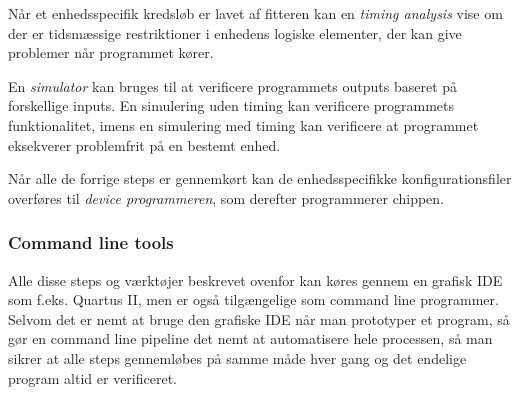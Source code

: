 Når et enhedsspecifik kredsløb er lavet af fitteren kan en \emph{timing analysis} vise om der er tidsmæssige restriktioner i enhedens
logiske elementer, der kan give problemer når programmet kører.

En \emph{simulator} kan bruges til at verificere programmets outputs baseret på
forskellige inputs. En simulering uden timing kan verificere programmets
funktionalitet, imens en simulering med timing kan verificere at programmet
eksekverer problemfrit på en bestemt enhed.

Når alle de forrige steps er gennemkørt kan de enhedsspecifikke
konfigurationsfiler overføres til \emph{device programmeren}, som derefter
programmerer chippen.

\subsubsection{Command line tools}

Alle disse steps og værktøjer beskrevet ovenfor kan køres gennem en grafisk IDE
som f.eks. Quartus II, men er også tilgængelige som command line programmer.
Selvom det er nemt at bruge den grafiske IDE når man prototyper et program, så
gør en command line pipeline det nemt at automatisere hele processen, så man
sikrer at alle steps gennemløbes på samme måde hver gang og det endelige program
altid er verificeret.
